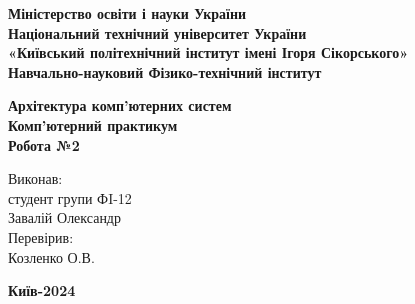 \documentclass[a4paper,12pt]{article}
\begin{document}
    \pagestyle{fancy}
    \fancyhead{}
    \begin{center}
        \large{\textbf{Міністерство освіти і науки України\\
                Національний технічний університет України\\
                «Київський політехнічний інститут імені Ігоря Сікорського»\\
                Навчально-науковий Фізико-технічний інститут}}\\
        \hfill \break \hfill \break \hfill\break \hfill \break \hfill \break \hfill \break \hfill \break
        \hfill \break \hfill \break \hfill \break
        \begin{center}
            \normalsize{\textbf{Архітектура комп'ютерних систем\\
            Комп’ютерний практикум\\
            Робота №2}}
        \end{center}
    \end{center}
    \hfill \break \hfill \break \hfill \break \hfill \break \hfill \break \hfill \break \hfill \break
    \hfill \break \hfill \break \hfill \break \hfill \break 
    \begin{flushright}
        \large{ \hspace{35pt} Виконав:\\
            студент групи ФI-12\\
            Завалій Олександр\\} 
        \large{ \hspace{35pt} Перевірив:\\
        Козленко О.В.} 
    \end{flushright}
    \hfill \break \hfill \break \hfill \break \hfill \break \hfill \break \hfill \break \hfill \break
    \hfill \break
    \begin{center} \textbf{Київ-2024} \end{center}
    \thispagestyle{empty}
\end{document}

